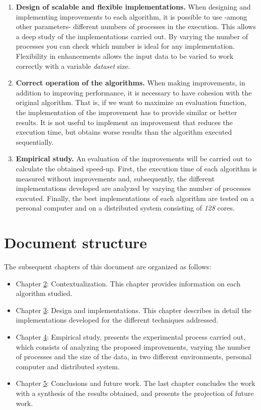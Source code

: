 \begin{enumerate}		
	\item \textbf{Design of scalable and flexible implementations.} When designing and implementing improvements to each algorithm, it is possible to use -among other parameters- different numbers of processes in the execution. This allows a deep study of the implementations carried out. By varying the number of processes you can check which number is ideal for any implementation. Flexibility in enhancements allows the input data to be varied to work correctly with a variable \textit{dataset} size.
	\item \textbf{Correct operation of the algorithms.} When making improvements, in addition to improving performance, it is necessary to have cohesion with the original algorithm. That is, if we want to maximize an evaluation function, the implementation of the improvement has to provide similar or better results. It is not useful to implement an improvement that reduces the execution time, but obtains worse results than the algorithm executed sequentially.
	\item \textbf{Empirical study.} An evaluation of the improvements will be carried out to calculate the obtained speed-up. First, the execution time of each algorithm is measured without improvements and, subsequently, the different implementations developed are analyzed by varying the number of processes executed. Finally, the best implementations of each algorithm are tested on a personal computer and on a distributed system consisting of \textit{128} cores.
\end{enumerate}





\section{Document structure}
The subsequent chapters of this document are organized as follows:	
\begin{itemize}		
	\item Chapter \hyperref[cap:c2_context]{2}: Contextualization. This chapter provides information on each algorithm studied.
	\item Chapter \hyperref[cap:c3_implementaciones]{3}: Design and implementations. This chapter describes in detail the implementations developed for the different techniques addressed.
	\item Chapter \hyperref[cap:c4_estudio]{4}: Empirical study, presents the experimental process carried out, which consists of analyzing the proposed improvements, varying the number of processes and the size of the data, in two different environments, personal computer and distributed system.
	\item Chapter \hyperref[cap:c5_conclu]{5}: Conclusions and future work. The last chapter concludes the work with a synthesis of the results obtained, and presents the projection of future work.
\end{itemize}


